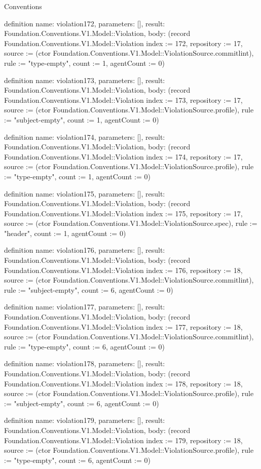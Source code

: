 \begin{lexlean}{Conventions}
\begin{semanticmodule}
definition{
  name: violation172,
  parameters: [],
  result: Foundation.Conventions.V1.Model::Violation,
  body: (record Foundation.Conventions.V1.Model::Violation {index := 172, repository := 17, source := (ctor Foundation.Conventions.V1.Model::ViolationSource.commitlint), rule := "type-empty", count := 1, agentCount := 0})
}

definition{
  name: violation173,
  parameters: [],
  result: Foundation.Conventions.V1.Model::Violation,
  body: (record Foundation.Conventions.V1.Model::Violation {index := 173, repository := 17, source := (ctor Foundation.Conventions.V1.Model::ViolationSource.profile), rule := "subject-empty", count := 1, agentCount := 0})
}

definition{
  name: violation174,
  parameters: [],
  result: Foundation.Conventions.V1.Model::Violation,
  body: (record Foundation.Conventions.V1.Model::Violation {index := 174, repository := 17, source := (ctor Foundation.Conventions.V1.Model::ViolationSource.profile), rule := "type-empty", count := 1, agentCount := 0})
}

definition{
  name: violation175,
  parameters: [],
  result: Foundation.Conventions.V1.Model::Violation,
  body: (record Foundation.Conventions.V1.Model::Violation {index := 175, repository := 17, source := (ctor Foundation.Conventions.V1.Model::ViolationSource.spec), rule := "header", count := 1, agentCount := 0})
}

definition{
  name: violation176,
  parameters: [],
  result: Foundation.Conventions.V1.Model::Violation,
  body: (record Foundation.Conventions.V1.Model::Violation {index := 176, repository := 18, source := (ctor Foundation.Conventions.V1.Model::ViolationSource.commitlint), rule := "subject-empty", count := 6, agentCount := 0})
}

definition{
  name: violation177,
  parameters: [],
  result: Foundation.Conventions.V1.Model::Violation,
  body: (record Foundation.Conventions.V1.Model::Violation {index := 177, repository := 18, source := (ctor Foundation.Conventions.V1.Model::ViolationSource.commitlint), rule := "type-empty", count := 6, agentCount := 0})
}

definition{
  name: violation178,
  parameters: [],
  result: Foundation.Conventions.V1.Model::Violation,
  body: (record Foundation.Conventions.V1.Model::Violation {index := 178, repository := 18, source := (ctor Foundation.Conventions.V1.Model::ViolationSource.profile), rule := "subject-empty", count := 6, agentCount := 0})
}

definition{
  name: violation179,
  parameters: [],
  result: Foundation.Conventions.V1.Model::Violation,
  body: (record Foundation.Conventions.V1.Model::Violation {index := 179, repository := 18, source := (ctor Foundation.Conventions.V1.Model::ViolationSource.profile), rule := "type-empty", count := 6, agentCount := 0})
}


\end{semanticmodule}
\end{lexlean}
